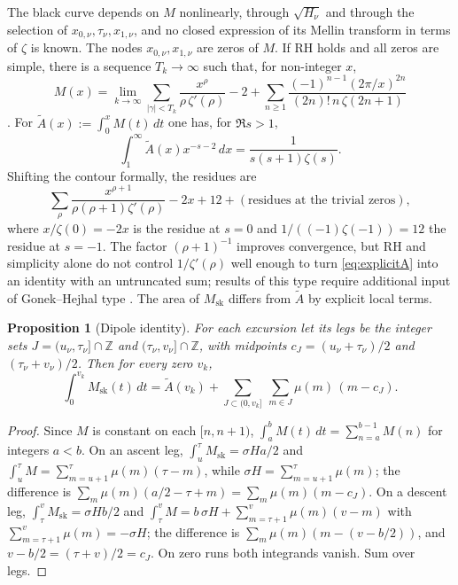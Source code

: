 \documentclass[11pt]{amsart}
\numberwithin{equation}{section}
\theoremstyle{plain}
\newtheorem{proposition}[theorem]{Proposition}
\theoremstyle{definition}
\theoremstyle{remark}
\newcommand{\Msk}{M_{\mathrm{sk}}}
\begin{document}
The black curve depends on $M$ nonlinearly, through $\sqrt{H_\nu}$ and
through the selection of $x_{0,\nu},\tau_\nu,x_{1,\nu}$, and no closed
expression of its Mellin transform in terms of $\zeta$ is known. The nodes
$x_{0,\nu},x_{1,\nu}$ are zeros of $M$. If RH holds and all zeros are
simple, there is a sequence $T_k\to\infty$ such that, for non-integer $x$,
\begin{equation}
\label{eq:explicitM}
  M(x)=\lim_{k\to\infty}\sum_{|\gamma|<T_k}\frac{x^\rho}{\rho\,\zeta'(\rho)}-2
  +\sum_{n\ge1}\frac{(-1)^{n-1}(2\pi/x)^{2n}}{(2n)!\,n\,\zeta(2n+1)}
\end{equation}
\cite[\S14.27]{Titchmarsh1986}. For $\widetilde{A}(x):=\int_0^xM(t)\,dt$ one
has, for $\Re s>1$,
\begin{equation}
\label{eq:mellin_A}
  \int_1^\infty \widetilde{A}(x)x^{-s-2}\,dx=\frac{1}{s(s+1)\zeta(s)}.
\end{equation}
Shifting the contour formally, the residues are
\begin{equation}
\label{eq:explicitA}
  \sum_\rho\frac{x^{\rho+1}}{\rho(\rho+1)\zeta'(\rho)}-2x+12
  +(\text{residues at the trivial zeros}),
\end{equation}
where $x/\zeta(0)=-2x$ is the residue at $s=0$ and
$1/((-1)\zeta(-1))=12$ the residue at $s=-1$. The factor $(\rho+1)^{-1}$
improves convergence, but RH and simplicity alone do not control
$1/\zeta'(\rho)$ well enough to turn \eqref{eq:explicitA} into an identity
with an untruncated sum; results of this type require additional input of
Gonek--Hejhal type \cite{Ng2004}. The area of $\Msk$ differs from
$\widetilde A$ by explicit local terms.

\begin{proposition}[Dipole identity]
\label{prop:dipoles}
For each excursion let its \emph{legs} be the integer sets
$J=(u_\nu,\tau_\nu]\cap\mathbb{Z}$ and
$(\tau_\nu,v_\nu]\cap\mathbb{Z}$, with midpoints $c_J=(u_\nu+\tau_\nu)/2$
and $(\tau_\nu+v_\nu)/2$. Then for every zero $v_k$,
\begin{equation}
\label{eq:dipoles}
  \int_0^{v_k}\Msk(t)\,dt=\widetilde{A}(v_k)
  +\sum_{J\subset(0,v_k]}\ \sum_{m\in J}\mu(m)\,(m-c_J).
\end{equation}
\end{proposition}

\begin{proof}
Since $M$ is constant on each $[n,n+1)$, $\int_a^bM(t)\,dt=\sum_{n=a}^{b-1}M(n)$
for integers $a<b$. On an ascent leg, $\int_{u}^{\tau}\Msk=\sigma H a/2$ and
$\int_u^\tau M=\sum_{m=u+1}^{\tau}\mu(m)(\tau-m)$, while
$\sigma H=\sum_{m=u+1}^{\tau}\mu(m)$; the difference is
$\sum_m\mu(m)(a/2-\tau+m)=\sum_m\mu(m)(m-c_J)$. On a descent leg,
$\int_\tau^v\Msk=\sigma Hb/2$ and
$\int_\tau^vM=b\,\sigma H+\sum_{m=\tau+1}^{v}\mu(m)(v-m)$ with
$\sum_{m=\tau+1}^{v}\mu(m)=-\sigma H$; the difference is
$\sum_m\mu(m)(m-(v-b/2))$, and $v-b/2=(\tau+v)/2=c_J$. On zero runs
both integrands vanish. Sum over legs.
\end{proof}
\end{document}
